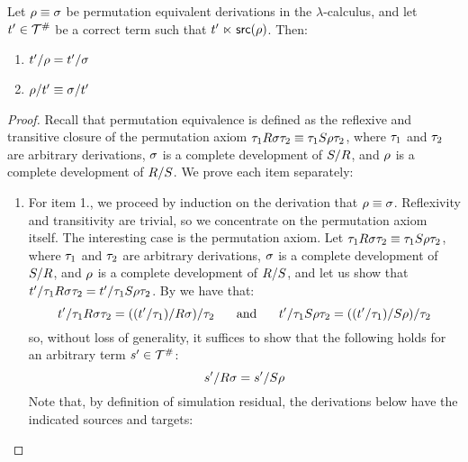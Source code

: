 \begin{proposition}[Compatibility] %
Let $\rho \equiv \sigma$ be permutation equivalent derivations in the $\lambda$-calculus,
and let $t' \in \mathcal{T}^{\mathtt{\#}}$ be a correct term such that $t' \mathrel{\ltimes} \mathsf{src}(\rho)$.
Then:
\begin{enumerate}
\item $t'/\rho = t'/\sigma$
\item $\rho/t' \equiv \sigma/t'$
\end{enumerate}
\end{proposition}
\begin{proof}
Recall that permutation equivalence is defined as the reflexive and transitive closure of the
permutation axiom $\tau_1 R \sigma \tau_2 \equiv \tau_1 S \rho \tau_2$,
where
$\tau_1$ and $\tau_2$ are arbitrary derivations,
$\sigma$ is a complete development of $S/R$,
and $\rho$ is a complete development of $R/S$.
We prove each item separately:
\begin{enumerate}
\item
  For item 1., we proceed by induction on the derivation that $\rho \equiv \sigma$.
  Reflexivity and transitivity are trivial, so we concentrate on the permutation axiom itself.
  The interesting case is the permutation axiom.
  Let $\tau_1 R \sigma \tau_2 \equiv \tau_1 S \rho \tau_2$,
  where
  $\tau_1$ and $\tau_2$ are arbitrary derivations,
  $\sigma$ is a complete development of $S/R$,
  and $\rho$ is a complete development of $R/S$,
  and let us show that $t'/\tau_1 R \sigma \tau_2 = t'/\tau_1 S \rho \tau_2$.
  By  we have that:
  \[
    t'/\tau_1 R \sigma \tau_2 = ((t'/\tau_1)/R \sigma)/\tau_2
    \hspace{.5cm}
    \text{ and }
    \hspace{.5cm}
    t'/\tau_1 S \rho \tau_2 = ((t'/\tau_1)/S \rho)/ \tau_2
  \]
  so, without loss of generality,
  it suffices to show that the following holds for an arbitrary term $s' \in \mathcal{T}^{\mathtt{\#}}$:
  \[
    s'/R\sigma = s'/S\rho
  \]
  Note that, by definition of simulation residual, the derivations below have the indicated sources and targets:

\end{enumerate}
\end{proof}
